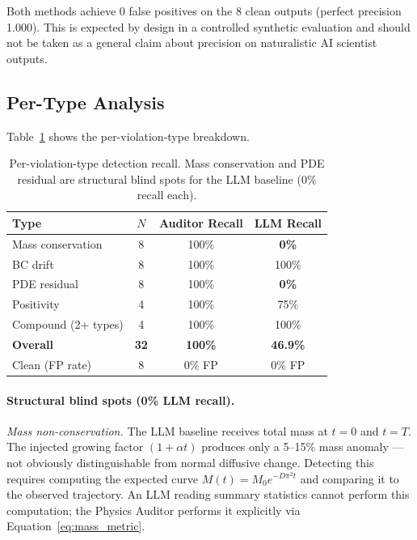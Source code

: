 \documentclass{article}
\begin{document}
Both methods achieve 0 false positives on the 8 clean outputs (perfect
precision 1.000).
This is expected by design in a controlled synthetic evaluation and should
not be taken as a general claim about precision on naturalistic AI scientist
outputs.

\subsection{Per-Type Analysis}

Table~\ref{tab:pertype} shows the per-violation-type breakdown.

\begin{table}[t]
  \caption{Per-violation-type detection recall.
    Mass conservation and PDE residual are structural blind spots
    for the LLM baseline (0\% recall each).}
  \label{tab:pertype}
  \centering
  \begin{tabular}{lccc}
    \toprule
    Type & $N$ & Auditor Recall & LLM Recall \\
    \midrule
    Mass conservation   & 8  & 100\%  & \textbf{0\%}   \\
    BC drift            & 8  & 100\%  & 100\% \\
    PDE residual        & 8  & 100\%  & \textbf{0\%}   \\
    Positivity          & 4  & 100\%  & 75\%  \\
    Compound (2+ types) & 4  & 100\%  & 100\% \\
    \midrule
    \textbf{Overall}    & \textbf{32} & \textbf{100\%} & \textbf{46.9\%} \\
    Clean (FP rate)     & 8  & 0\% FP & 0\% FP \\
    \bottomrule
  \end{tabular}
\end{table}

\paragraph{Structural blind spots (0\% LLM recall).}
\emph{Mass non-conservation.}
The LLM baseline receives total mass at $t=0$ and $t=T$.
The injected growing factor $(1 + \alpha t)$ produces only a 5--15\% mass
anomaly --- not obviously distinguishable from normal diffusive change.
Detecting this requires computing the expected curve
$M(t) = M_0 e^{-D\pi^2 t}$ and comparing it to the observed trajectory.
An LLM reading summary statistics cannot perform this computation;
the Physics Auditor performs it explicitly via Equation~\eqref{eq:mass_metric}.
\end{document}
